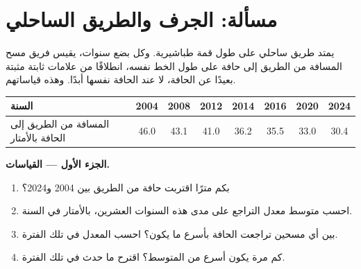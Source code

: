 \section{مسألة: الجرف والطريق الساحلي}

\begin{problem}
\label{pb:g9:landforms:1}
يمتد طريق ساحلي على طول قمة  طباشيرية. وكل بضع سنوات، يقيس فريق مسح
المسافة من الطريق إلى حافة  على طول الخط نفسه، انطلاقًا من علامات
ثابتة مثبتة بعيدًا عن الحافة، لا عند الحافة نفسها أبدًا. وهذه
قياساتهم.

\begin{center}
{\small
\begin{tabular}{|l|c|c|c|c|c|c|c|}
\hline
السنة & 2004 & 2008 & 2012 & 2014 & 2016 & 2020 & 2024 \\
\hline
المسافة من الطريق إلى الحافة بالأمتار & 46.0 & 43.1 & 41.0 & 36.2 & 35.5 & 33.0 & 30.4 \\
\hline
\end{tabular}}
\end{center}

\noindent\textbf{الجزء الأول --- القياسات.}\par\nopagebreak
\begin{enumerate}[beginpenalty=10000]
  \item بكم مترًا اقتربت حافة  من الطريق بين 2004
        و2024؟
  \item احسب متوسط معدل التراجع على مدى هذه السنوات العشرين، بالأمتار
        في السنة.
  \item بين أي مسحين تراجعت الحافة بأسرع ما يكون؟ احسب المعدل في تلك
        الفترة.
  \item كم مرة يكون أسرع من المتوسط؟ اقترح ما حدث في تلك
        الفترة.
\end{enumerate}

\begin{omfigure}


\end{omfigure}
\end{problem}
